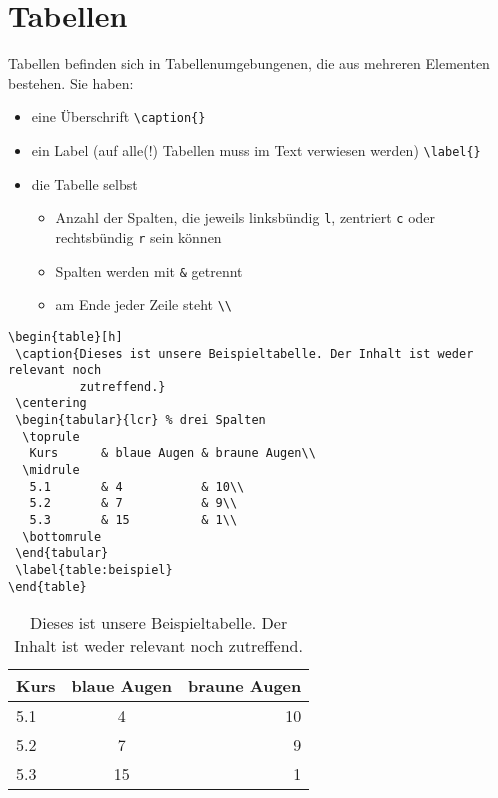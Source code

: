 \section{Tabellen}
Tabellen befinden sich in Tabellenumgebungenen, die
aus mehreren Elementen bestehen. Sie haben:

\begin{itemize}
 \item eine Überschrift \lstinline$\caption{}$
 \item ein Label (auf alle(!) Tabellen muss im Text verwiesen werden)
       \lstinline$\label{}$
 \item die Tabelle selbst
 \begin{itemize}
  \item Anzahl der Spalten, die jeweils linksbündig \lstinline$l$, zentriert
        \lstinline$c$ oder rechtsbündig \lstinline$r$ sein können
  \item Spalten werden mit \lstinline$&$ getrennt
  \item am Ende jeder Zeile steht \lstinline$\\$
 \end{itemize}
\end{itemize}

\begin{lstlisting}
\begin{table}[h]
 \caption{Dieses ist unsere Beispieltabelle. Der Inhalt ist weder relevant noch
          zutreffend.}
 \centering
 \begin{tabular}{lcr} % drei Spalten
  \toprule
   Kurs      & blaue Augen & braune Augen\\
  \midrule
   5.1       & 4           & 10\\
   5.2       & 7           & 9\\
   5.3       & 15          & 1\\
  \bottomrule
 \end{tabular}
 \label{table:beispiel}
\end{table}
\end{lstlisting}

\begin{table}[h]
 \caption{Dieses ist unsere Beispieltabelle. Der Inhalt ist weder relevant noch
          zutreffend.}
 \centering
 \begin{tabular}{lcr} %
  \toprule
   Kurs      & blaue Augen & braune Augen\\
  \midrule
   5.1       & 4           & 10\\
   5.2       & 7           & 9\\
   5.3       & 15          & 1\\
  \bottomrule
 \end{tabular}
 \label{table:beispiel}
\end{table}
